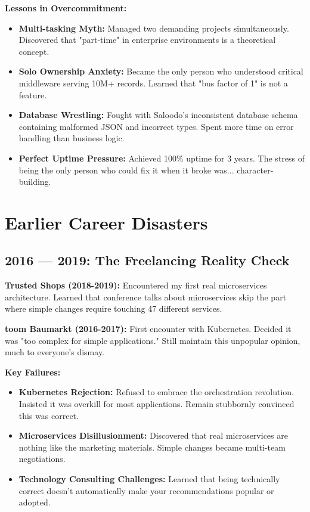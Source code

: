 \documentclass[10pt,a4paper]{article}
\begin{document}
\textbf{Lessons in Overcommitment:}
\begin{itemize}[leftmargin=1em, itemsep=0.2em]
\item \textbf{Multi-tasking Myth:} Managed two demanding projects simultaneously. Discovered that "part-time" in enterprise environments is a theoretical concept.
\item \textbf{Solo Ownership Anxiety:} Became the only person who understood critical middleware serving 10M+ records. Learned that "bus factor of 1" is not a feature.
\item \textbf{Database Wrestling:} Fought with Saloodo's inconsistent database schema containing malformed JSON and incorrect types. Spent more time on error handling than business logic.
\item \textbf{Perfect Uptime Pressure:} Achieved 100\% uptime for 3 years. The stress of being the only person who could fix it when it broke was... character-building.
\end{itemize}

\section{Earlier Career Disasters}

\subsection{2016 — 2019: The Freelancing Reality Check}
\textbf{Trusted Shops (2018-2019):} Encountered my first real microservices architecture. Learned that conference talks about microservices skip the part where simple changes require touching 47 different services.

\textbf{toom Baumarkt (2016-2017):} First encounter with Kubernetes. Decided it was "too complex for simple applications." Still maintain this unpopular opinion, much to everyone's dismay.

\textbf{Key Failures:}
\begin{itemize}[leftmargin=1em, itemsep=0.2em]
\item \textbf{Kubernetes Rejection:} Refused to embrace the orchestration revolution. Insisted it was overkill for most applications. Remain stubbornly convinced this was correct.
\item \textbf{Microservices Disillusionment:} Discovered that real microservices are nothing like the marketing materials. Simple changes became multi-team negotiations.
\item \textbf{Technology Consulting Challenges:} Learned that being technically correct doesn't automatically make your recommendations popular or adopted.
\end{itemize}
\end{document}
